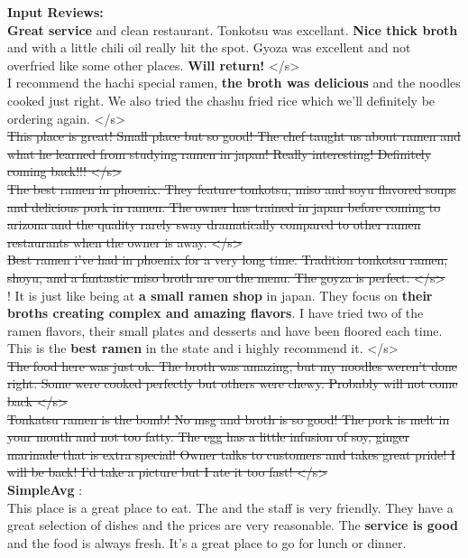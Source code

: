 \documentclass[11pt]{article}
\newcommand{\gray}[1]{{\color[HTML]{808080} \sout{#1}}}
\newcommand\two[1]{\textcolor{c2}{\textbf{#1}}}
\newcommand\three[1]{\textcolor{c3}{\textbf{#1}}}
\newcommand\four[1]{\textcolor{c4}{\textbf{#1}}}
\newcommand\five[1]{\textcolor{c5}{\textbf{#1}}}
\newcommand\six[1]{\textcolor{c6}{\textbf{#1}}}
\begin{document}
\begin{figure*}[th]
    \small
    \vspace{1em}
    \begin{mdframed}
        \textbf{Input Reviews: }\\
        \two{Great service} and clean restaurant. Tonkotsu was excellant. \five{Nice thick broth} and with a little chili oil really hit the spot. Gyoza was excellent and not overfried like some other places. \six{Will return!} </s> \\
        I recommend the hachi special ramen, \five{the broth was delicious} and the noodles cooked just right. We also tried the chashu fried rice which we'll definitely be ordering again. </s>\\
        \gray{This place is great! Small place but so good! The chef taught us about ramen and what he learned from studying ramen in japan! Really interesting! Definitely coming back!!! </s>}
        \\
        \gray{The best ramen in phoenix. They feature tonkotsu, miso and soyu flavored soups and delicious pork in ramen. The owner has trained in japan before coming to arizona and the quality rarely sway dramatically compared to other ramen restaurants when the owner is away. </s>} \\ 
        \gray{Best ramen i've had in phoenix for a very long time. Tradition tonkotsu ramen, shoyu, and a fantastic miso broth are on the menu. The goyza is perfect. </s>}\\ 
        ! It is just like being at \three{a small ramen shop} in japan. They focus on \five{their broths creating complex and amazing flavors}. I have tried two of the ramen flavors, their small plates and desserts and have been floored each time. This is the \four{best ramen} in the state and i highly recommend it. </s>\\ 
        \gray{The food here was just ok. The broth was amazing, but my noodles weren't done right. Some were cooked perfectly but others were chewy. Probably will not come back </s>}\\
        \gray{Tonkatsu ramen is the bomb! No msg and broth is so good! The pork is melt in your mouth and not too fatty. The egg has a little infusion of soy, ginger marinade that is extra special! Owner talks to customers and takes great pride! I will be back! I'd take a picture but I ate it too fast! </s> }\\
        

        \textbf{SimpleAvg} :\\
        This place is a great place to eat. The  and the staff is very friendly. They have a great selection of dishes and the prices are very reasonable. The \two{service is good} and the food is always fresh. It's a great place to go for lunch or dinner.\\
        

\end{mdframed}
\end{figure*}
\end{document}

